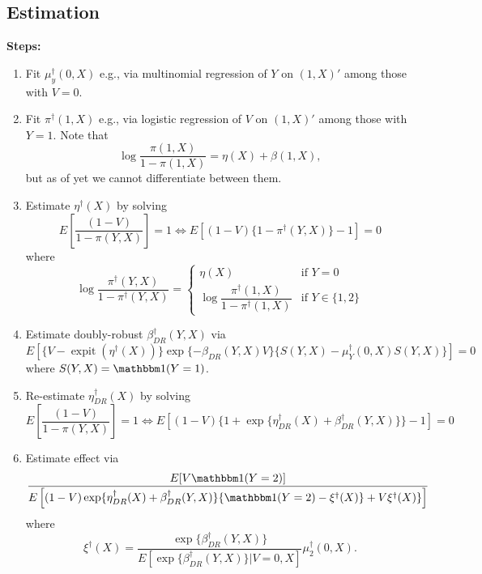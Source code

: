 \begin{appendix}
\begin{refsection}
\subsection{Estimation}
\textbf{Steps:}
\begin{enumerate}
    \item Fit $\mu_y^\dagger(0,X)$ e.g., via multinomial regression of $Y$ on $(1,X)'$ among those with $V= 0$.
    \item Fit $\pi^\dagger(1,X)$ e.g., via logistic regression of $V$ on $(1,X)'$ among those with $Y=1$. Note that 
    \[\log \dfrac{\pi(1,X)}{1-\pi(1,X)} = \eta(X) + \beta(1, X),\]
    but as of yet we cannot differentiate between them.
    \item Estimate $\eta^\dagger(X)$ by solving 
    \[E\left[\dfrac{(1-V)}{1 -\pi(Y,X)}\right] = 1 \iff E[(1-V)\{1 - \pi^\dagger(Y,X)\} - 1] = 0\]
    where 
    \[\log \dfrac{\pi^\dagger(Y,X)}{1 - \pi^\dagger(Y,X)} = \begin{cases} \eta(X) & \text{if } Y = 0 \\
    \log \dfrac{\pi^\dagger(1,X)}{1-\pi^\dagger(1,X)}  & \text{if } Y \in \{1,2\}
    \end{cases}\]
    \item Estimate doubly-robust $\beta_{DR}^\dagger(Y,X)$ via 
    \[E\left[\{V - \operatorname{expit}(\eta^\dagger(X))\}\exp\{-\beta_{DR}(Y,X)V\}\{S(Y,X) - \mu_Y^\dagger(0, X)S(Y,X)\}\right] = 0\]
    where $S(Y,X) = \mathbbm 1 (Y = 1)$.
    \item Re-estimate $\eta_{DR}^\dagger(X)$ by solving 
    \[E\left[\dfrac{(1-V)}{1 -\pi(Y,X)}\right] = 1 \iff E[(1-V)\{1 + \exp\{\eta_{DR}^\dagger(X) + \beta^\dagger_{DR}(Y,X)\}\} - 1] = 0\]
    \item Estimate effect via
    \[\dfrac{E[V \mathbbm 1(Y =2)]}{ E\left[(1 - V) \exp\{\eta_{DR}^\dagger(X) + \beta^\dagger_{DR}(Y,X)\}\{\mathbbm 1(Y = 2) - \xi^\dagger(X)\} + V\xi^\dagger(X)\}  \right]}\]
    where
    \[\xi^\dagger(X)= \dfrac{\exp\{\beta^\dagger_{DR}(Y,X)\}}{E[\exp\{\beta^\dagger_{DR}(Y,X)\}|V=0,X ]}\mu_2^\dagger(0,X).\]
\end{enumerate}
\newpage

\end{refsection}
\end{appendix}
